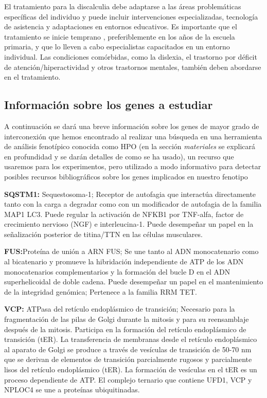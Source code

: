 \hfill

El tratamiento para la discalculia debe adaptarse a las áreas problemáticas específicas del individuo y puede incluir intervenciones  especializadas, tecnología de asistencia y adaptaciones en entornos educativos. Es importante que el tratamiento se inicie temprano \cite{ManagementDis}, preferiblemente en los años de la escuela primaria, y que lo lleven a cabo especialistas capacitados en un entorno individual. Las condiciones comórbidas, como la dislexia, el trastorno por déficit de atención/hiperactividad y otros trastornos mentales, también deben abordarse en el tratamiento.

\hfill

\subsection{Información sobre los genes a estudiar}


A continuación se dará una breve información sobre los genes de mayor grado de interconexión que hemos encontrado al realizar una búsqueda en una herramienta de análisis fenotípico conocida como HPO \cite{HPO_paper} (en la sección \emph{materiales} se explicará en profundidad y se darán detalles de como se ha usado), un recurso que usaremos para los experimentos, pero utilizado a modo informativo para detectar posibles recursos bibliográficos sobre los genes implicados en nuestro fenotipo

\hfill

\textbf{SQSTM1\cite{SQSTM1}:} Sequestosoma-1; Receptor de autofagia que interactúa directamente tanto con la carga a degradar como con un modificador de autofagia de la familia MAP1 LC3. Puede regular la activación de NFKB1 por TNF-alfa, factor de crecimiento nervioso (NGF) e interleucina-1. Puede desempeñar un papel en la señalización posterior de titina/TTN en las células musculares.

\hfill

\textbf{FUS\cite{FUS}:}Proteína de unión a ARN FUS; Se une tanto al ADN monocatenario como al bicatenario y promueve la hibridación independiente de ATP de los ADN monocatenarios complementarios y la formación del bucle D en el ADN superhelicoidal de doble cadena. Puede desempeñar un papel en el mantenimiento de la integridad genómica; Pertenece a la familia RRM TET.

\hfill

\textbf{VCP\cite{VCP}:} ATPasa del retículo endoplásmico de transición; Necesario para la fragmentación de las pilas de Golgi durante la mitosis y para su reensamblaje después de la mitosis. Participa en la formación del retículo endoplásmico de transición (tER). La transferencia de membranas desde el retículo endoplásmico al aparato de Golgi se produce a través de vesículas de transición de 50-70 nm que se derivan de elementos de transición parcialmente rugosos y parcialmente lisos del retículo endoplásmico (tER). La formación de vesículas en el tER es un proceso dependiente de ATP. El complejo ternario que contiene UFD1, VCP y NPLOC4 se une a proteínas ubiquitinadas.

